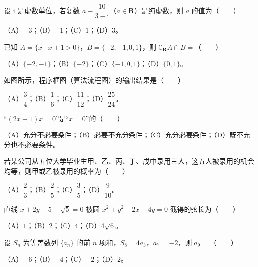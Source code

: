 

\begin{question}
设 $\mathrm i$ 是虚数单位，若复数 $a-\dfrac{10}{3-\mathrm i}$（$a\in\mathbf R$）是纯虚数，则 $a$ 的值为\mbox{（　　）}

（A）$-3$；（B）$-1$；（C）$1$；（D）$3$。

\end{question}
\begin{question}
已知 $A=\{x\mid x+1>0\}$，$B=\{-2,-1,0,1\}$，则 $\complement_{\mathbf R}A\cap B=$\mbox{（　　）}

（A）$\{-2,-1\}$；（B）$\{-2\}$；（C）$\{-1,0,1\}$；（D）$\{0,1\}$。

\Needspace{0.4\textheight}
\end{question}
\begin{question}
如图所示，程序框图（算法流程图）的输出结果是\mbox{（　　）}
\nopagebreak[4]
\begin{center}\end{center}
\nopagebreak[4]
（A）$\dfrac34$；（B）$\dfrac16$；（C）$\dfrac{11}{12}$；（D）$\dfrac{25}{24}$。

\end{question}
\begin{question}
“$(2x-1)x=0$”是“$x=0$”的\mbox{（　　）}

（A）充分不必要条件；（B）必要不充分条件；（C）充分必要条件；（D）既不充分也不必要条件。

\end{question}
\begin{question}
若某公司从五位大学毕业生甲、乙、丙、丁、戊中录用三人，这五人被录用的机会均等，则甲或乙被录用的概率为\mbox{（　　）}

（A）$\dfrac23$；（B）$\dfrac25$；（C）$\dfrac35$；（D）$\dfrac9{10}$。

\end{question}
\begin{question}
直线 $x+2y-5+\sqrt5=0$ 被圆 $x^2+y^2-2x-4y=0$ 截得的弦长为\mbox{（　　）}

（A）$1$；（B）$2$；（C）$4$；（D）$4\sqrt6$。

\end{question}
\begin{question}
设 $S_n$ 为等差数列 $\{a_n\}$ 的前 $n$ 项和，$S_8=4a_3$，$a_7=-2$，则 $a_9=$\mbox{（　　）}

（A）$-6$；（B）$-4$；（C）$-2$；（D）$2$。

\Needspace{0.4\textheight}
\end{question}
